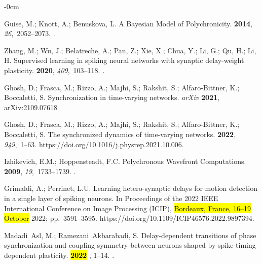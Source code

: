 \documentclass[brainsci, %
               review,accept,pdftex,moreauthors
               ]{Definitions/mdpi}
\begin{document}
\begin{adjustwidth}{-\extralength}{0cm}
\begin{thebibliography}{999}
Guise, M.; Knott, A.; Benuskova, L.
\newblock A {Bayesian} {Model} of {Polychronicity}.
 {\bf 2014}, {\em 26},~2052--2073.
.

Zhang, M.; Wu, J.; Belatreche, A.; Pan, Z.; Xie, X.; Chua, Y.; Li, G.; Qu, H.;
  Li, H.
\newblock Supervised learning in spiking neural networks with synaptic
  delay-weight plasticity.
 {\bf 2020}, {\em 409},~103--118.
.

Ghosh, D.; Frasca, M.; Rizzo, A.; Majhi, S.; Rakshit, S.; Alfaro-Bittner, K.;
  Boccaletti, S.
\newblock Synchronization in time-varying networks. \emph{arXiv} {\bf 2021}, arXiv:2109.07618

Ghosh, D.; Frasca, M.; Rizzo, A.; Majhi, S.; Rakshit, S.; Alfaro-Bittner, K.;
  Boccaletti, S.
\newblock The synchronized dynamics of time-varying networks.
 {\bf 2022}, {\em 949},~1--63.
  {{https://doi.org/10.1016/j.physrep.2021.10.006}}.

Izhikevich, E.M.; Hoppensteadt, F.C.
\newblock Polychronous {Wavefront} {Computations}.
 {\bf 2009}, {\em
  19},~1733--1739.
.

Grimaldi, A.; Perrinet, L.U.
\newblock Learning hetero-synaptic delays for motion detection in a single
  layer of spiking neurons.
\newblock In Proceedings of the 2022 {IEEE} {International} {Conference} on
  {Image} {Processing} ({ICIP}), \hl{Bordeaux, France, 16--19 October} %
 2022; pp.~3591--3595.
  {{https://doi.org/10.1109/ICIP46576.2022.9897394}}.

Madadi~Asl, M.; Ramezani~Akbarabadi, S.
\newblock Delay-dependent transitions of phase synchronization and coupling
  symmetry between neurons shaped by spike-timing-dependent plasticity.
 {\bf \hl{2022} %
}, 1--14.
.


\end{thebibliography}
\end{adjustwidth}
\end{document}
